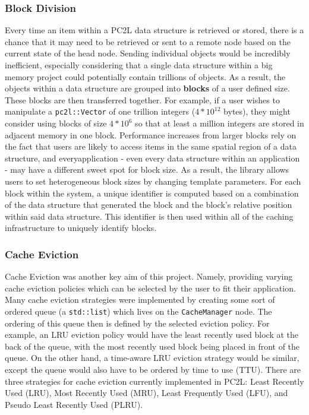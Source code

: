 \subsubsection{Block Division} \label{sec:block_div}
Every time an item within a PC2L data structure is retrieved or stored, there is a chance that it may need to be retrieved or sent to a remote node based on the current state of the head node. Sending individual objects would be incredibly inefficient, especially considering that a single data structure within a big memory project could potentially contain trillions of objects. As a result, the objects within a data structure are grouped into \textbf{blocks} of a user defined size. These blocks are then transferred together. For example, if a user wishes to manipulate a \texttt{pc2l::Vector} of one trillion integers ($4*10^{12}$ bytes), they might consider using blocks of size $4*10^6$ so that at least a million integers are stored in adjacent memory in one block. Performance increases from larger blocks rely on the fact that users are likely to access items in the same spatial region of a data structure, and everyapplication - even every data structure within an application - may have a different sweet spot for block size. As a result, the library allows users to set heterogeneous block sizes by changing template parameters. 
For each block within the system, a unique identifier is computed based on a combination of the data structure that generated the block and the block's relative position within said data structure. This identifier is then used within all of the caching infrastructure to uniquely identify blocks. 

\subsubsection{Cache Eviction}
Cache Eviction was another key aim of this project. Namely, providing varying cache eviction policies  which can be selected by the user to fit their application. Many cache eviction strategies were implemented by creating some sort of ordered queue (a \texttt{std::list}) which lives on the \texttt{CacheManager} node. The ordering of this queue then is defined by the selected eviction policy. For example, an LRU eviction policy would have the least recently used block at the back of the queue, with the most recently used block being placed in front of the queue. On the other hand, a time-aware LRU eviction strategy would be similar, except the queue would also have to be ordered by time to use (TTU). There are three strategies for cache eviction currently implemented in PC2L: Least Recently Used (LRU), Most Recently Used (MRU), Least Frequently Used (LFU), and Pseudo Least Recently Used (PLRU). 

